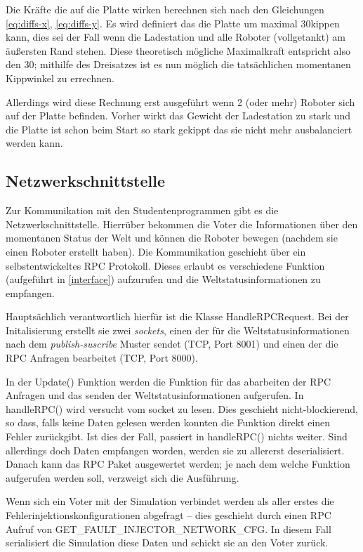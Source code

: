 Die Kr{\"{a}}fte die auf die Platte wirken berechnen sich nach den Gleichungen \ref{eq:diffs-x}, \ref{eq:diffs-y}. Es wird definiert das die Platte um
maximal 30\textdegree kippen kann, dies sei der Fall wenn die Ladestation und alle Roboter (vollgetankt) am {\"{a}}u{\ss}ersten Rand stehen. Diese theoretisch
m{\"{o}}gliche Maximalkraft entspricht also den 30\textdegree; mithilfe des Dreisatzes ist es nun m{\"{o}}glich die tats{\"{a}}chlichen momentanen Kippwinkel
zu errechnen.

Allerdings wird diese Rechnung erst ausgef{\"{u}}hrt wenn 2 (oder mehr) Roboter sich auf der Platte befinden. Vorher wirkt das Gewicht der Ladestation zu
stark und die Platte ist schon beim Start so stark gekippt das sie nicht mehr ausbalanciert werden kann.

\subsection{Netzwerkschnittstelle}
Zur Kommunikation mit den Studentenprogrammen gibt es die Netzwerkschnittstelle. Hierr{\"{u}}ber bekommen die Voter die Informationen {\"{u}}ber den momentanen
Status der Welt und k{\"{o}}nnen die Roboter bewegen (nachdem sie einen Roboter erstellt haben). Die Kommunikation geschieht {\"{u}}ber ein selbstentwickeltes
RPC Protokoll. Dieses erlaubt es verschiedene Funktion (aufgef{\"{u}}hrt in \ref{interface}) aufzurufen und die Weltstatusinformationen zu empfangen.

Haupts{\"{a}}chlich verantwortlich hierf{\"{u}}r ist die Klasse HandleRPCRequest. Bei der Initalisierung erstellt sie zwei \textit{sockets}, einen der f{\"{u}}r
die Weltstatusinformationen nach dem \textit{publish-suscribe} Muster sendet (TCP, Port 8001) und einen der die RPC Anfragen bearbeitet (TCP, Port 8000).

In der Update() Funktion werden die Funktion f{\"{u}}r das abarbeiten der RPC Anfragen und das senden der Weltstatusinformationen aufgerufen. In handleRPC()
wird versucht vom socket zu lesen. Dies geschieht nicht-blockierend, so dass, falls keine Daten gelesen werden konnten die Funktion direkt einen Fehler
zur{\"{u}}ckgibt. Ist dies der Fall, passiert in handleRPC() nichts weiter. Sind allerdings doch Daten empfangen worden, werden sie zu allererst deserialisiert.
Danach kann das RPC Paket ausgewertet werden; je nach dem welche Funktion aufgerufen werden soll, verzweigt sich die Ausf{\"{u}}hrung.

Wenn sich ein Voter mit der Simulation verbindet werden als aller erstes die Fehlerinjektionskonfigurationen abgefragt -- dies geschieht durch einen RPC Aufruf
von GET\_FAULT\_INJECTOR\_NETWORK\_CFG. In diesem Fall serialisiert die Simulation diese Daten und schickt sie an den Voter zur{\"{u}}ck.

